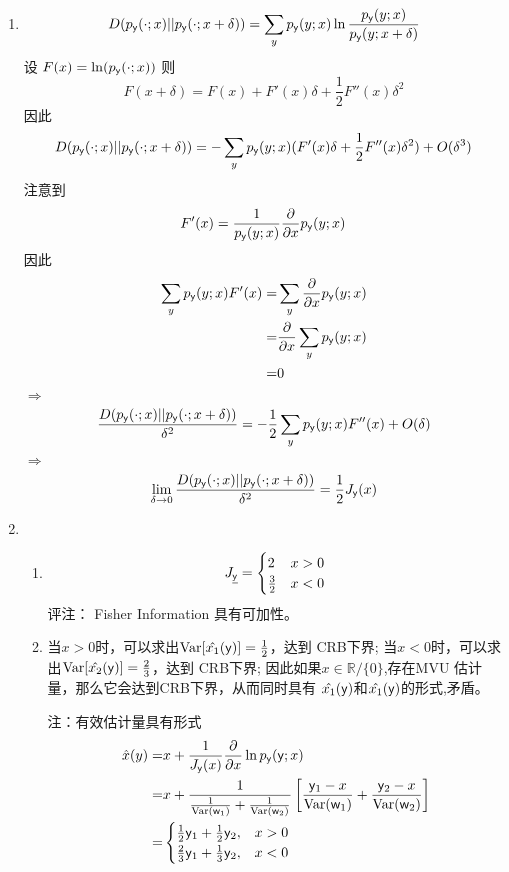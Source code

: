 \documentclass[a4paper]{article}
\begin{document}
\begin{enumerate}[label=\thehwcnt.\arabic*.]
  \setlength{\itemsep}{3\parskip}

  \item 
  \[
  D(p_{\mathsf{y}}(\cdot;x)||p_{\mathsf{y}}(\cdot;x+\delta))=
  \sum_{y} p_{\mathsf{y}}(y;x) \ln \frac{p_{\mathsf{y}}(y;x)}{p_{\mathsf{y}}(y;x+\delta)}
  \]
  设 $F(x)=\ln (p_{\mathsf{y}}(\cdot;x))$
  则 
  \[
  F(x+\delta)=F(x)+F'(x)\delta+\frac{1}{2}F''(x)\delta^2
  \]
  因此
  \[
  D(p_{\mathsf{y}}(\cdot;x)||p_{\mathsf{y}}(\cdot;x+\delta))=
  -\sum_{y} p_{\mathsf{y}}(y;x) (F'(x)\delta+\frac{1}{2}F''(x)\delta^2)+O(\delta^3)
  \]
  注意到
  $$
  F'(x)=\frac{1}{p_{\mathsf{y}}(y;x)} \frac{\partial}{\partial x} p_{\mathsf{y}}(y;x)
  $$
  因此
  \begin{align}
  \sum_{y} p_{\mathsf{y}}(y;x) F'(x)=&\sum_{y} \frac{\partial}{\partial x} p_{\mathsf{y}}(y;x)\\
  = & \frac{\partial}{\partial x} \sum_{y}  p_{\mathsf{y}}(y;x) \\
  = & 0
  \end{align}
  $\Rightarrow$
  \[
   \frac{D(p_{\mathsf{y}}(\cdot;x)||p_{\mathsf{y}}(\cdot;x+\delta))}{\delta^2}=
   -\frac{1}{2}\sum_{y} p_{\mathsf{y}}(y;x) F''(x)+O(\delta)
  \]
  $\Rightarrow$
  \[
   \lim_{\delta \to 0} \frac{D(p_{\mathsf{y}}(\cdot;x)||p_{\mathsf{y}}(\cdot;x+\delta))}{\delta^2}=
   \frac{1}{2}J_{\mathsf{y}}(x)  
  \]  
  
  \item 
  \begin{enumerate}[label=(\alph*)]
  \item 
   \[
   J_{\underline{\mathsf{y}}}=\begin{cases}
   2 & x>0\\
   \frac{3}{2} & x<0
   \end{cases}
   \]
   评注： Fisher Information 具有可加性。
  
  \item
  当$x>0$时，可以求出$\operatorname{Var}[\hat{x_1}(\mathsf{y})]=\frac{1}{2}$，达到 CRB下界;
  当$x<0$时，可以求出$\operatorname{Var}[\hat{x_2}(\mathsf{y})]=\frac{2}{3}$，达到 CRB下界;
  因此如果$x\in \mathbb{R}/\{0\}$,存在MVU 估计量，那么它会达到CRB下界，从而同时具有
  $\hat{x_1}(\mathsf{y})$和$\hat{x_1}(\mathsf{y})$的形式,矛盾。

  注：有效估计量具有形式
  \begin{align*}
   \hat{x}(y) = & x + \frac{1}{J_{\mathsf{y}}(x)} \frac{\partial}{\partial x}\ln p_{\mathsf{y}}(\mathsf{y};x) \\
               = & x + \frac{1}{\frac{1}{\operatorname{Var}(\mathsf{w}_1)}+\frac{1}{\operatorname{Var}(\mathsf{w}_2)}}\left[
    \frac{\mathsf{y}_1-x}{\operatorname{Var}(\mathsf{w}_1)} + \frac{\mathsf{y}_2-x}{\operatorname{Var}(\mathsf{w}_2)} \right] \\
               = & \begin{cases}
                    \frac{1}{2}\mathsf{y}_1 +\frac{1}{2}\mathsf{y}_2 ,& x>0 \\
                    \frac{2}{3}\mathsf{y}_1 +\frac{1}{3}\mathsf{y}_2 ,& x<0
                    \end{cases}
  \end{align*}
  

\end{enumerate}
\end{enumerate}
\end{document}
